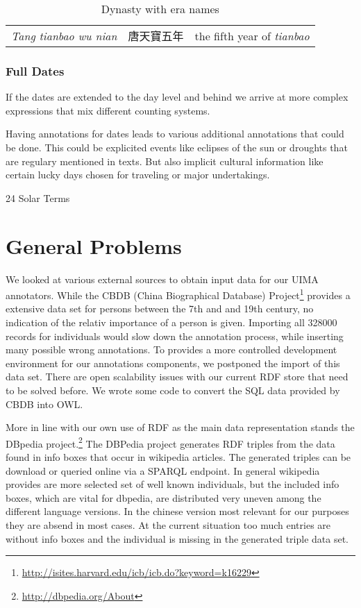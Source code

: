 \documentclass[12pt, draft]{article}
\begin{document}
{\footnotesize
\begin{table}[h]
\caption{Dynasty with era names}
\begin{tabular}{lll}
\hline
\emph{Tang tianbao wu nian} & 唐天寶五年 & the fifth year of \emph{tianbao} \\
\end{tabular}
\end{table}
}


\subsubsection{Full Dates}
If the dates are extended to the day level and behind we arrive at more complex
expressions that mix different counting systems.


Having annotations for dates leads to various additional annotations that could
be done.  This could be explicited  events like eclipses of the sun or droughts that
are regulary mentioned in texts. But also implicit cultural information
like certain lucky days chosen for traveling or major undertakings.
 
24 Solar Terms

\section{General Problems}

We looked at various external sources to obtain
input data for our UIMA annotators.
While the 
CBDB (China Biographical Database) Project\footnote{\url{http://isites.harvard.edu/icb/icb.do?keyword=k16229}}
provides a extensive data set for persons between the 7th and and 19th century, 
no indication of the relativ importance of a person is given.
Importing all 328000 records for individuals would slow down 
the annotation process, while inserting many possible wrong annotations.
To provides a more controlled development environment for our annotations
components, we postponed the import of this data set. There are open
scalability issues with our current RDF store that need to be solved before.
We wrote some code to convert the SQL data provided
by CBDB into OWL.

More in line with our own use of RDF as the main data representation
stands the DBpedia project.\footnote{\url{http://dbpedia.org/About}}
The DBPedia project generates RDF triples from the data found in info boxes that occur in wikipedia articles.
The generated triples can be download or queried online via a SPARQL endpoint.
In general wikipedia provides are more selected set of well known individuals,
but the included info boxes, which are vital for dbpedia, are distributed
very uneven among the different language versions. In the chinese version
most relevant for our purposes they are absend in most cases.
At the current situation too much entries
are without info boxes and the individual is missing in the generated triple data set.
\end{document}
